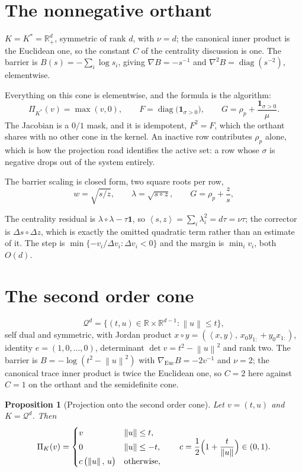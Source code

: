 \documentclass[a4paper,11pt]{book}
\theoremstyle{plain}
\newtheorem{proposition}[theorem]{Proposition}
\theoremstyle{definition}
\theoremstyle{remark}
\numberwithin{equation}{chapter}
\numberwithin{algorithm}{chapter}
\newcommand{\R}{\mathbb{R}}
\newcommand{\proj}[2]{\Pi_{#2}\!\left(#1\right)}
\newcommand{\norm}[1]{\left\|#1\right\|}
\newcommand{\inner}[2]{\left\langle #1, #2 \right\rangle}
\newcommand{\diag}{\operatorname{diag}}
\begin{document}
	\section{The nonnegative orthant}

	$K=K^*=\R^d_+$, symmetric of rank $d$, with $\nu=d$; the canonical inner product
	is the Euclidean one, so the constant $C$ of the centrality discussion is one.
	The barrier is $B(s)=-\sum_i\log s_i$, giving $\nabla B=-s^{-1}$ and
	$\nabla^2B=\diag(s^{-2})$, elementwise.

	Everything on this cone is elementwise, and the formula is the algorithm:
	\[
	\proj{v}{K^*}=\max(v,0),
	\qquad
	F=\diag\bigl(\mathbf{1}_{\sigma>0}\bigr),
	\qquad
	G=\rho_p+\frac{\mathbf{1}_{\sigma>0}}{\mu} .
	\]
	The Jacobian is a $0/1$ mask, and it is idempotent, $F^2=F$, which the orthant
	shares with no other cone in the kernel. An inactive row contributes $\rho_p$
	alone, which is how the projection road identifies the active set: a row whose
	$\sigma$ is negative drops out of the system entirely.

	The barrier scaling is closed form, two square roots per row,
	\[
	w=\sqrt{s/z},
	\qquad
	\lambda=\sqrt{s\circ z},
	\qquad
	G=\rho_p+\frac{z}{s} ,
	\]
	
	The centrality residual is $\lambda\circ\lambda-\tau\mathbf{1}$, so
	$\inner{s}{z}=\sum_i\lambda_i^2=d\tau=\nu\tau$; the corrector is
	$\Delta s\circ\Delta z$, which is exactly the omitted quadratic term rather
	than an estimate of it. The step is
	$\min\{-v_i/\Delta v_i:\Delta v_i<0\}$ and the margin is $\min_iv_i$, both
	$O(d)$.

	\section{The second order cone}

	\[
	\mathcal{Q}^d=\bigl\{(t,u)\in\R\times\R^{d-1}:\norm{u}\leq t\bigr\} ,
	\]
	self dual and symmetric, with Jordan product
	$x\circ y=(\inner{x}{y},\,x_0y_{1:}+y_0x_{1:})$, identity $e=(1,0,\dots,0)$,
	determinant $\det v=t^2-\norm{u}^2$ and rank two. The barrier is
	$B=-\log(t^2-\norm{u}^2)$ with $\nabla_{\mathrm{Euc}}B=-2v^{-1}$ and $\nu=2$;
	the canonical trace inner product is twice the Euclidean one, so $C=2$ here
	against $C=1$ on the orthant and the semidefinite cone.

	\begin{proposition}[Projection onto the second order cone]\label{prop:socproj}
		Let $v=(t,u)$ and $K=\mathcal{Q}^d$. Then
		\begin{equation}
			\proj{v}{K}=
			\begin{cases}
				v & \norm{u}\leq t,\\[1mm]
				0 & \norm{u}\leq -t,\\[1mm]
				c\,\bigl(\norm{u},\,u\bigr) & \text{otherwise},
			\end{cases}
			\qquad
			c=\frac12\Bigl(1+\frac{t}{\norm{u}}\Bigr)\in(0,1) .
		\end{equation}
	\end{proposition}
\end{document}
